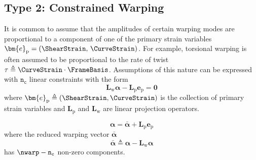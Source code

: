 \subsection{Type 2: Constrained Warping} 

It is common to assume that the amplitudes of certain warping modes are proportional to a component of one of the primary strain variables \(\bm{e}_{\mathrm{p}} = (\ShearStrain,\,\CurveStrain)\). For example, torsional warping is often assumed to be proportional to the rate of twist \(\tau \triangleq \CurveStrain\cdot \FrameBasis\).
Assumptions of this nature can be expressed with \(\mathtt{n_c}\) linear constraints with the form 
\begin{equation}
\mathbf{L}_{\mathrm{w}}\bm{\alpha} - \mathbf{L}_{\mathrm{p}}\bm{e}_{\mathrm{p}} = \bm{0}
\label{eq:linear-warp-constraints}
\end{equation}
where \(\bm{e}_{\mathrm{p}} \triangleq (\ShearStrain, \CurveStrain)\) is the collection of primary strain variables and \(\mathbf{L}_{\mathrm{p}}\) and \(\mathbf{L}_{\mathrm{w}}\) are linear projection operators.

\begin{equation}
    \bm{\alpha} = \bar{\bm{\alpha}} + \mathbf{L}_{\mathrm{p}}\bm{e}_{\mathrm{p}}
\label{eq:decompose-alpha}
\end{equation}
where the reduced warping vector \(\bar{\bm{\alpha}}\)
$$
\bar{\bm{\alpha}} \triangleq \bm{\alpha} - \mathbf{L}_{\mathrm{w}} \bm{\alpha}
$$
has \(\nwarp - \mathtt{n_c}\) non-zero components.


